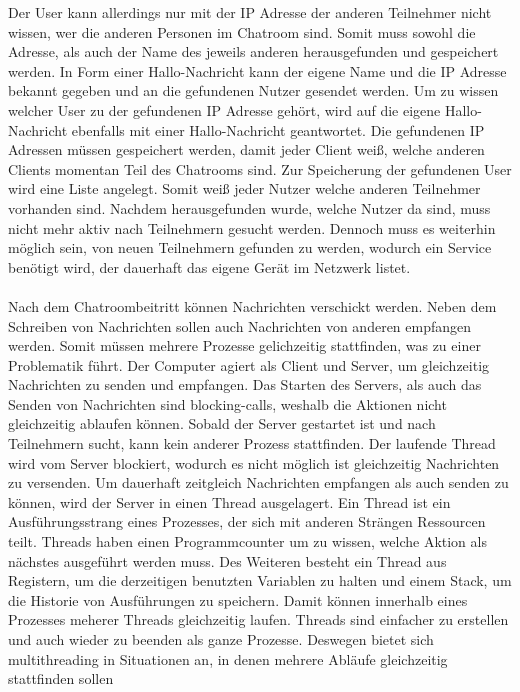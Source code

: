 Der User kann allerdings nur mit der IP Adresse der anderen Teilnehmer nicht wissen, wer die anderen Personen im Chatroom sind. 
Somit muss sowohl die Adresse, als auch der Name des jeweils anderen herausgefunden und gespeichert werden. 
In Form einer Hallo-Nachricht kann der eigene Name und die IP Adresse bekannt gegeben und an die gefundenen Nutzer gesendet werden. 
Um zu wissen welcher User zu der gefundenen IP Adresse gehört, wird auf die eigene Hallo-Nachricht ebenfalls mit einer Hallo-Nachricht geantwortet. 
Die gefundenen IP Adressen müssen gespeichert werden, damit jeder Client weiß, welche anderen Clients momentan Teil des Chatrooms sind. 
Zur Speicherung der gefundenen User wird eine Liste angelegt. Somit weiß jeder Nutzer welche anderen Teilnehmer vorhanden sind. 
Nachdem herausgefunden wurde, welche Nutzer da sind, muss nicht mehr aktiv nach Teilnehmern gesucht werden. 
Dennoch muss es weiterhin möglich sein, von neuen Teilnehmern gefunden zu werden, wodurch ein Service benötigt wird, der dauerhaft das eigene Gerät im Netzwerk listet.
\\
\\
Nach dem Chatroombeitritt können Nachrichten verschickt werden. 
Neben dem Schreiben von Nachrichten sollen auch Nachrichten von anderen empfangen werden. 
Somit müssen mehrere Prozesse gelichzeitig stattfinden, was zu einer Problematik führt. 
Der Computer agiert als Client und Server, um gleichzeitig Nachrichten zu senden und empfangen. 
Das Starten des Servers, als auch das Senden von Nachrichten sind blocking-calls, weshalb die Aktionen nicht gleichzeitig ablaufen können.
Sobald der Server gestartet ist und nach Teilnehmern sucht, kann kein anderer Prozess stattfinden. 
Der laufende Thread wird vom Server blockiert, wodurch es nicht möglich ist gleichzeitig Nachrichten zu versenden. 
Um dauerhaft zeitgleich Nachrichten empfangen als auch senden zu können, wird der Server in einen Thread ausgelagert. 
Ein Thread ist ein Ausführungsstrang eines Prozesses, der sich mit anderen Strängen Ressourcen teilt.
Threads haben einen Programmcounter um zu wissen, welche Aktion als nächstes ausgeführt werden muss. Des Weiteren besteht ein Thread aus Registern, um die derzeitigen benutzten Variablen zu halten und einem Stack, 
um die Historie von Ausführungen zu speichern\cite[S. 103]{tan15}. 
Damit können innerhalb eines Prozesses meherer Threads gleichzeitig laufen\cite{multithreading_2017}. 
Threads sind einfacher zu erstellen und auch wieder zu beenden als ganze Prozesse. Deswegen bietet sich multithreading in Situationen an, in denen mehrere Abläufe gleichzeitig stattfinden sollen\cite[S. 98]{tan15}
